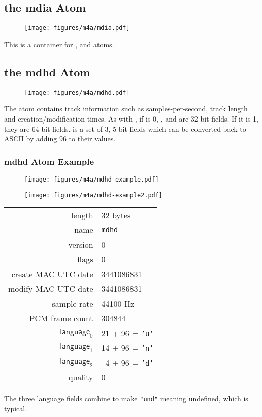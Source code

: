\clearpage

\subsection{the mdia Atom}
\begin{figure}[h]
  \texttt{[image: figures/m4a/mdia.pdf]}
\end{figure}
\par
\noindent
This is a container for ,  and  atoms.

\subsection{the mdhd Atom}
\begin{figure}[h]
\texttt{[image: figures/m4a/mdhd.pdf]}
\end{figure}
\par
\noindent
The  atom contains track information such as samples-per-second,
track length and creation/modification times.
As with , if  is 0, ,
 and  are 32-bit fields.
If it is 1, they are 64-bit fields.
 is a set of 3, 5-bit fields which can be converted
back to ASCII by adding 96 to their values.

\clearpage

\subsubsection{mdhd Atom Example}
\begin{figure}[h]
  \texttt{[image: figures/m4a/mdhd-example.pdf]}
\end{figure}
\begin{figure}[h]
  \texttt{[image: figures/m4a/mdhd-example2.pdf]}
\end{figure}
\par
\noindent
\begin{tabular}{rl}
  \textsf{length} & 32 bytes \\
  \textsf{name} & \texttt{mdhd} \\
  \textsf{version} & 0 \\
  \textsf{flags} & 0 \\
  \textsf{create MAC UTC date} & 3441086831 \\
  \textsf{modify MAC UTC date} & 3441086831 \\
  \textsf{sample rate} & 44100 Hz \\
  \textsf{PCM frame count} & 304844 \\
  $\textsf{language}_0$ & \multicolumn{1}{r}{21 + 96 = \texttt{'u'}} \\
  $\textsf{language}_1$ & \multicolumn{1}{r}{14 + 96 = \texttt{'n'}} \\
  $\textsf{language}_2$ & \multicolumn{1}{r}{4 + 96 = \texttt{'d'}} \\
  \textsf{quality} & 0 \\
\end{tabular}
\par
\noindent
The three language fields combine to make \texttt{"und"} meaning
undefined, which is typical.

